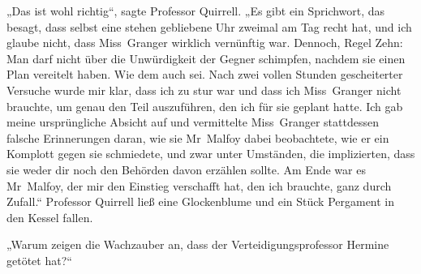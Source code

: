 „Das ist wohl richtig“, sagte Professor Quirrell.
„Es gibt ein Sprichwort, das besagt, dass selbst eine stehen gebliebene Uhr zweimal am Tag recht hat, und ich glaube nicht, dass Miss~Granger wirklich vernünftig war. Dennoch, Regel Zehn: Man darf nicht über die Unwürdigkeit der Gegner schimpfen, nachdem sie einen Plan vereitelt haben. Wie dem auch sei. Nach zwei vollen Stunden gescheiterter Versuche wurde mir klar, dass ich zu stur war und dass ich Miss~Granger nicht brauchte, um genau den Teil auszuführen, den ich für sie geplant hatte. Ich gab meine ursprüngliche Absicht auf und vermittelte Miss~Granger stattdessen falsche Erinnerungen daran, wie sie Mr~Malfoy dabei beobachtete, wie er ein Komplott gegen sie schmiedete, und zwar unter Umständen, die implizierten, dass sie weder dir noch den Behörden davon erzählen sollte. Am Ende war es Mr~Malfoy, der mir den Einstieg verschafft hat, den ich brauchte, ganz durch Zufall.“
Professor Quirrell ließ eine Glockenblume und ein Stück Pergament in den Kessel fallen.

„Warum zeigen die Wachzauber an, dass der Verteidigungsprofessor Hermine getötet hat?“

